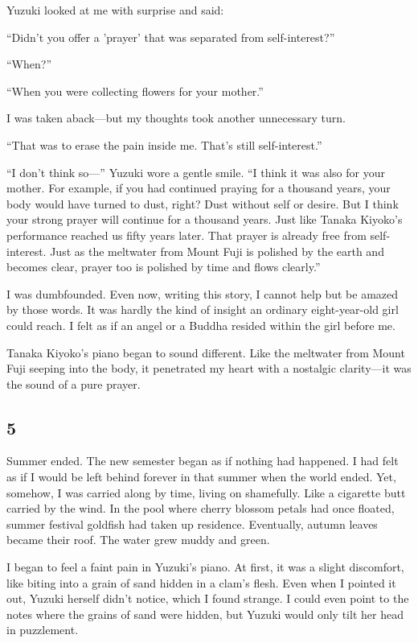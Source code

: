 \documentclass[
    a4paper,
    12pt,
    twoside,
    openany,
    UTF8,
    fontset=windows
]{ctexbook}
\begin{document}
Yuzuki looked at me with surprise and said:

``Didn't you offer a 'prayer' that was separated from self-interest?''

``When?''

``When you were collecting flowers for your mother.''

I was taken aback---but my thoughts took another unnecessary turn.

``That was to erase the pain inside me. That's still self-interest.''

``I don't think so---'' Yuzuki wore a gentle smile. ``I think it was also for your mother. For example, if you had continued praying for a thousand years, your body would have turned to dust, right? Dust without self or desire. But I think your strong prayer will continue for a thousand years. Just like Tanaka Kiyoko's performance reached us fifty years later. That prayer is already free from self-interest. Just as the meltwater from Mount Fuji is polished by the earth and becomes clear, prayer too is polished by time and flows clearly.''

I was dumbfounded. Even now, writing this story, I cannot help but be amazed by those words. It was hardly the kind of insight an ordinary eight-year-old girl could reach. I felt as if an angel or a Buddha resided within the girl before me.

Tanaka Kiyoko's piano began to sound different. Like the meltwater from Mount Fuji seeping into the body, it penetrated my heart with a nostalgic clarity---it was the sound of a pure prayer.


\subsection*{5}

Summer ended. The new semester began as if nothing had happened. I had felt as if I would be left behind forever in that summer when the world ended. Yet, somehow, I was carried along by time, living on shamefully. Like a cigarette butt carried by the wind. In the pool where cherry blossom petals had once floated, summer festival goldfish had taken up residence. Eventually, autumn leaves became their roof. The water grew muddy and green.

I began to feel a faint pain in Yuzuki's piano. At first, it was a slight discomfort, like biting into a grain of sand hidden in a clam's flesh. Even when I pointed it out, Yuzuki herself didn't notice, which I found strange. I could even point to the notes where the grains of sand were hidden, but Yuzuki would only tilt her head in puzzlement.
\end{document}
